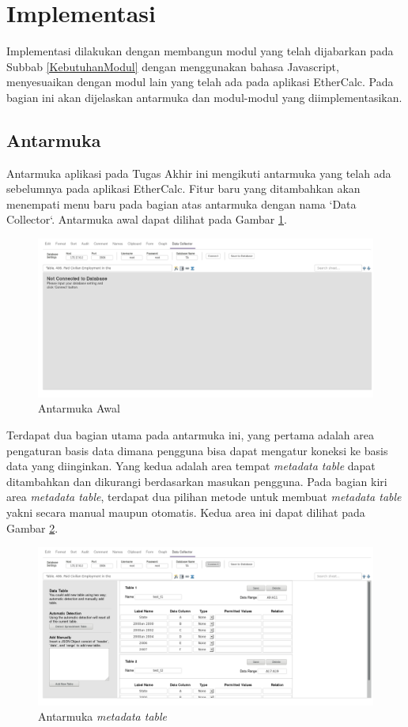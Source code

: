 \section{Implementasi}
Implementasi dilakukan dengan membangun modul yang telah dijabarkan pada Subbab \ref{KebutuhanModul} dengan menggunakan bahasa Javascript, menyesuaikan dengan modul lain yang telah ada pada aplikasi EtherCalc. Pada bagian ini akan dijelaskan antarmuka dan modul-modul yang diimplementasikan.
\subsection{Antarmuka}
Antarmuka aplikasi pada Tugas Akhir ini mengikuti antarmuka yang telah ada sebelumnya pada aplikasi EtherCalc. Fitur baru yang ditambahkan akan menempati menu baru pada bagian atas antarmuka dengan nama `Data Collector`. Antarmuka awal dapat dilihat pada Gambar \ref{Antarmuka1}.

\begin{figure}[htb]
	\centering
	\includegraphics[width=1.0\textwidth]{resources/chapter-4-interface-1.png}
	\caption{Antarmuka Awal}
	\label{Antarmuka1}
\end{figure}

Terdapat dua bagian utama pada antarmuka ini, yang pertama adalah area pengaturan basis data dimana pengguna bisa dapat mengatur koneksi ke basis data yang diinginkan. Yang kedua adalah area tempat \textit{metadata table} dapat ditambahkan dan dikurangi berdasarkan masukan pengguna. Pada bagian kiri area \textit{metadata table}, terdapat dua pilihan metode untuk membuat \textit{metadata table} yakni secara manual maupun otomatis. Kedua area ini dapat dilihat pada Gambar \ref{Antarmuka2}.

\begin{figure}[htbp]
	\centering
	\includegraphics[width=1.0\textwidth]{resources/chapter-4-interface-2.png}
	\caption{Antarmuka \textit{metadata table}}
	\label{Antarmuka2}
\end{figure}


